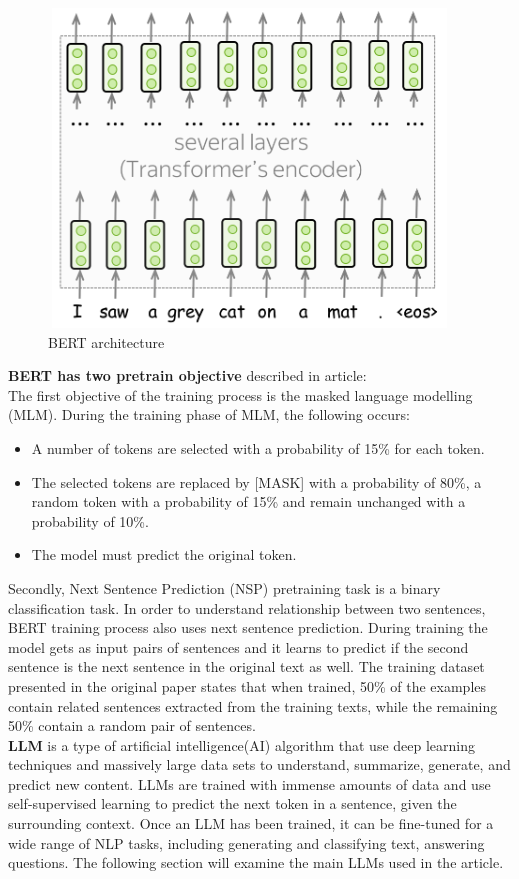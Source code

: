 \documentclass[PMI,VKR]{HSEUniversity}
\begin{document}
\begin{figure}[h]
    \centering
    \includegraphics[scale=0.8]{img/bert.png}
    \caption{BERT architecture}
\end{figure}

\textbf{BERT has two pretrain objective} described in article: \\
The first objective of the training process is the masked language modelling (MLM). 
During the training phase of MLM, the following occurs:

\begin{itemize}
    \item A number of tokens are selected with a probability of 15\% for each token.
    \item The selected tokens are replaced by [MASK] with a probability of 80\%, a random token with a probability of 15\% and remain unchanged with a probability of 10\%.
    \item The model must predict the original token.
\end{itemize}

Secondly, Next Sentence Prediction (NSP) pretraining task is a binary classification task. 
In order to understand relationship between two sentences, BERT training process also uses next sentence prediction.
During training the model gets as input pairs of sentences and it learns to predict if the second sentence is the next sentence in the original text as well. 
The training dataset presented in the original paper states that when trained, 50\% of the examples contain related sentences extracted from the training texts, while the remaining 50\% contain a random pair of sentences.\\

\newpage
\textbf{LLM} is a type of artificial intelligence(AI) algorithm that use deep learning techniques and massively large data sets to understand, summarize, generate, and predict new content. 
LLMs are trained with immense amounts of data and use self-supervised learning to predict the next token in a sentence, given the surrounding context. 
Once an LLM has been trained, it can be fine-tuned for a wide range of NLP tasks, including generating and classifying text, answering questions.
The following section will examine the main LLMs used in the article.
\end{document}
